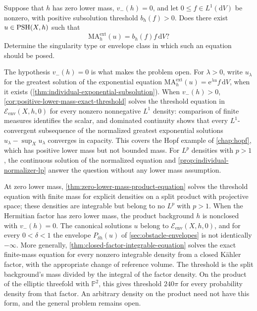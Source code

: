 \begin{problem}\label{qu:individual-equation-threshold}
Suppose that $h$ has zero lower mass, $v_-(h)=0$, and let $0\leq f\in L^1(\mathrm{d}V)$ be nonzero, with positive subsolution threshold $b_h(f)>0$. Does there exist $u\in\mathrm{PSH}(X,h)$ such that
\[
 \mathrm{MA}^{\mathrm{ext}}_h(u)=b_h(f)f\,\mathrm{d}V?
\]
Determine the singularity type or envelope class in which such an equation should be posed.
\end{problem}

The hypothesis $v_-(h)=0$ is what makes the problem open. For $\lambda>0$, write $u_\lambda$ for the greatest solution of the exponential equation $\mathrm{MA}^{\mathrm{ext}}_h(u)=\mathrm{e}^{\lambda u}f\,\mathrm{d}V$, when it exists (\cref{thm:individual-exponential-subsolution}). When $v_-(h)>0$, \cref{cor:positive-lower-mass-exact-threshold} solves the threshold equation in $\mathcal E_{\mathrm{env}}(X,h,0)$ for every nonzero nonnegative $L^1$ density: comparison of finite measures identifies the scalar, and dominated continuity shows that every $L^1$-convergent subsequence of the normalized greatest exponential solutions $u_\lambda-\sup_Xu_\lambda$ converges in capacity. This covers the Hopf example of \cref{chap:hopf}, which has positive lower mass but not bounded mass. For $L^p$ densities with $p>1$, the continuous solution of the normalized equation and \cref{prop:individual-normalizer-lp} answer the question without any lower mass assumption.

At zero lower mass, \cref{thm:zero-lower-mass-product-equation} solves the threshold equation with finite mass for explicit densities on a split product with projective space; these densities are integrable but belong to no $L^p$ with $p>1$. When the Hermitian factor has zero lower mass, the product background $h$ is nonclosed with $v_-(h)=0$. The canonical solutions $u$ belong to $\mathcal E_{\mathrm{env}}(X,h,0)$, and for every $0<\delta<1$ the envelope $P_{\delta h}(u)$ of \cref{sec:obstacle-envelopes} is not identically $-\infty$. More generally, \cref{thm:closed-factor-integrable-equation} solves the exact finite-mass equation for every nonzero integrable density from a closed K\"ahler factor, with the appropriate change of reference volume. The threshold is the split background's mass divided by the integral of the factor density. On the product of the elliptic threefold with $\mathbb P^2$, this gives threshold $240\pi$ for every probability density from that factor. An arbitrary density on the product need not have this form, and the general problem remains open.

